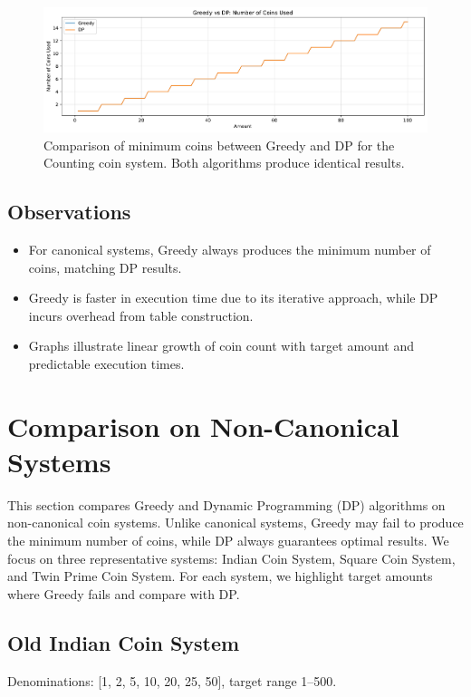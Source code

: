 \documentclass[12pt,a4paper]{report}
\begin{document}
\begin{figure}[H]
  \centering
  \includegraphics[width=\textwidth]{graphs/compare_coins_counting_plot.pdf}
  \caption{Comparison of minimum coins between Greedy and DP for the Counting coin system. Both algorithms produce identical results.}
  \label{fig:compare_coins_counting}
\end{figure}

\subsection{Observations}
\begin{itemize}
    \item For canonical systems, Greedy always produces the minimum number of coins, matching DP results.  
    \item Greedy is faster in execution time due to its iterative approach, while DP incurs overhead from table construction.  
    \item Graphs illustrate linear growth of coin count with target amount and predictable execution times.  
\end{itemize}

\section{Comparison on Non-Canonical Systems}
\label{sec:comparison_noncanonical}

This section compares Greedy and Dynamic Programming (DP) algorithms on non-canonical coin systems. Unlike canonical systems, Greedy may fail to produce the minimum number of coins, while DP always guarantees optimal results. We focus on three representative systems: Indian Coin System, Square Coin System, and Twin Prime Coin System. For each system, we highlight target amounts where Greedy fails and compare with DP.

\subsection{Old Indian Coin System}
Denominations: [1, 2, 5, 10, 20, 25, 50], target range 1--500. 
\end{document}
